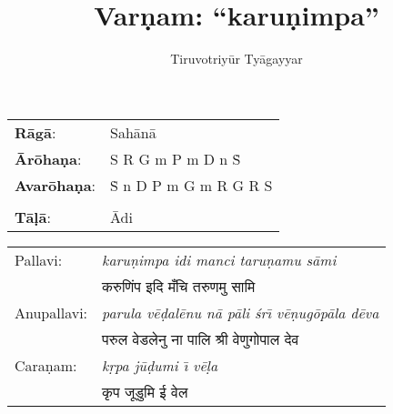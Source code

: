 \documentclass[12pt]{article}
\title{Var\d{n}am: ``karu\d nimpa''}
\author{Tiruvotriy\=ur Ty\=agayyar}
\date{}                                           %
\def \deva#1{{\fontspec{DevanagariMT}#1}}
\begin{document}
\maketitle
\begin{tabular}{ll}
\textbf{R\=ag\=a}: & Sah\=an\=a \\
\textbf{\=Ar\=oha\d na}: & S R G m P m D n \.S \\
\textbf{Avar\=oha\d na}: & \.S n D P m G m R G R S \\\\
\textbf{T\=a\d l\=a}: & \=Adi
\end{tabular}

\vspace{0.25 in}

\begin{tabular}{ll}
Pallavi: & \emph{karu\d nimpa idi manci taru\d namu s\=ami} \\
& \deva{करुणिंप इदि मँचि तरुणमु सामि}\\
Anupallavi: & \emph{parula v\=e\d{d}al\=enu n\=a p\=ali \'sr\=\i{} v\=e\d{n}ug\=op\=ala d\=eva} \\
&  \deva{परुल वेडलेनु ना पालि श्री वेणुगोपाल देव}\\
Cara\d nam: & \emph{k\d rpa j\=u\d dumi \=\i{} v\=e\d{l}a}\\
&  \deva{कृप जूडुमि ई वेल}
\end{tabular}

\def \speed{0.276in}
\def \f#1{\makebox[0.069in][l]{#1}}
\def \t#1{\makebox[0.138in][l]{#1}}
\def \s#1{\makebox[\speed][l]{#1}}

\def \four#1{#1\s{}}
\def \Four#1[#2]{#1#2}
\def \Sl {\s{\d{S}}}
\def \rl {\s{\d{r}}}
\def \Rl {\s{\d{R}}}
\def \gl {\s{\d{g}}}
\def \Gl {\s{\d{G}}}
\def \ml {\s{\d{m}}}
\def \Ml {\s{\d{M}}}
\def \Pl {\s{\d{P}}}
\def \dal {\s{\d{d}}}
\def \Dl {\s{\d{D}}}
\def \nl {\s{\d{n}}}
\def \Nl {\s{\d{N}}}
\def \S {\s{S}}
\def \r {\s{r}}
\def \R {\s{R}}
\def \g {\s{g}}
\def \G {\s{G}}
\def \m {\s{m}}
\def \M {\s{M}}
\def \P {\s{P}}
\def \da {\s{d}}
\def \D {\s{D}}
\def \n {\s{n}}
\def \N {\s{N}}
\def \Su {\s{\.S}}
\def \ru {\s{\.r}}
\def \Ru {\s{\.R}}
\def \gu {\s{\.g}}
\def \Gu {\s{\.G}}
\def \mu {\s{\.m}}
\def \Mu {\s{\.M}}
\def \Pu {\s{\.P}}
\def \dau {\s{\.d}}
\def \Du {\s{\.D}}
\def \nu {\s{\.n}}
\def \Nu {\s{\.N}}
\def \p {\s{,}}

\def \lagu {\s{$||$}}
\def \dhru {\s{$|$}}
\end{document}
